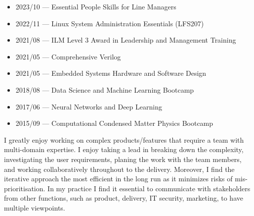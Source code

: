 \documentclass[10pt,a4paper,ragged2e,withhyper]{altacv}
\begin{document}
\begin{paracol}{2}
\begin{itemize}
    
    \item
    2023/10 --- Essential People Skills for Line Managers

    \item
    2022/11 --- Linux System Administration Essentials (LFS207)
    
    \item
    2021/08 --- ILM Level 3 Award in Leadership and Management Training
    
    \item
    2021/05 --- Comprehensive Verilog
    
    \item
    2021/05 --- Embedded Systems Hardware and Software Design
    
    \item
    2018/08 --- Data Science and Machine Learning Bootcamp
    
    \item
    2017/06 --- Neural Networks and Deep Learning
    
    \item
    2015/09 --- Computational Condensed Matter Physics Bootcamp
    
\end{itemize}




I greatly enjoy working on complex products/features that require a team with
multi-domain expertise.
I enjoy taking a lead in breaking down the complexity, investigating the user
requirements, planing the work with the team members, and working
collaboratively throughout to the delivery.
Moreover, I find the iterative approach the most efficient in the long run
as it minimizes risks of mis-prioritisation.
In my practice I find it essential to communicate with stakeholders from
other functions, such as product, delivery, IT security, marketing, to have
multiple viewpoints.


\end{paracol}
\end{document}
